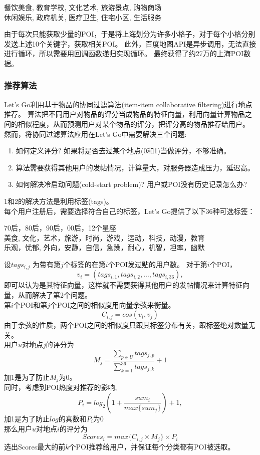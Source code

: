 \documentclass[UTF8]{article}
\begin{document}
\begin{tcolorbox}[colback=white]
\begin{center}
餐饮美食, 教育学校, 文化艺术, 旅游景点, 购物商场\\
休闲娱乐, 政府机关, 医疗卫生, 住宅小区, 生活服务
\end{center}
\end{tcolorbox}

由于每次只能获取少量的POI，于是将上海划分为许多小格子，对于每个小格分别发送上述10个关键字，获取相关POI。
此外，百度地图API是异步调用，无法直接进行循环，所以需要用回调函数递归实现循环。
最终获得了约27万的上海POI数据。

\subsubsection{推荐算法}
Let's Go利用基于物品的协同过滤算法(item-item collaborative filtering)进行地点推荐。
算法把不同用户对物品的评分当成物品的特征向量，利用向量计算物品之间的相似程度，从而预测用户对某个物品的评分，把评分高的物品推荐给用户。
然而，将协同过滤算法应用在Let's Go中需要解决三个问题:
\begin{enumerate}
    \item 如何定义评分? 如果将是否去过某个地点(0和1)当做评分，不够准确。
    \item 算法需要获得其他用户的发帖情况，计算量大，对服务器造成压力，延迟高。
    \item 如何解决冷启动问题(cold-start problem)? 用户或POI没有历史记录怎么办? 
\end{enumerate}
1和2的解决方法是利用标签(tags)。\\
每个用户注册后，需要选择符合自己的标签，Let’s Go提供了以下36种可选标签：

\begin{tcolorbox}[colback=white]
\begin{center}
70后，80后，90后，00后，12个星座\\
美食, 文化，艺术，旅游，时尚，游戏，运动，科技，动漫，教育\\
乐观，忧郁, 外向，安静，自信，急躁，耐心，机智，坦率，幽默
\end{center}
\end{tcolorbox}

设$tags_{i,j}$ 为带有第$j$个标签的在第$i$个POI发过贴的用户数。
对于第$i$个POI，\[v_i=(tags_{i,1},tags_{i,2},  …  ,tags_{i,36}),\]即可以认为是其特征向量，这样就不需要获得其他用户的发帖情况来计算特征向量，从而解决了第2个问题。\\
第$i$个POI和第$j$个POI之间的相似度用向量余弦来衡量。
\[C_{i,j}=cos(v_i,v_j)\]
由于余弦的性质，两个POI之间的相似度只跟其标签分布有关，跟标签绝对数量无关。\\
用户$u$对地点$j$的评分为
\[M_j=\frac{\sum_{p \in U}tags_{j,p}}{\sum_{k=1}^{36}tags_{j,k}}+1\]
加1是为了防止$M_j$为0。\\
同时，考虑到POI热度对推荐的影响,
\[P_i=log_2(1+\frac{sum_i}{max\{sum_j\}})+1,\]
加1是为了防止$log$的真数和$P_i$为0\\
那么用户$u$对地点$i$的评分为
\[Scores_i=max\{C_{i,j} \times M_j\} \times P_i\]
选出Scores最大的前$k$个POI推荐给用户，并保证每个分类都有POI被选取。
\end{document}
